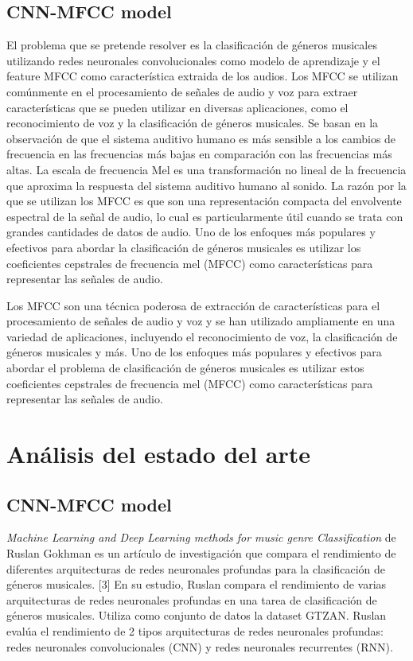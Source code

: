 \documentclass[colorinlistoftodos,twoside,twocolumn,10pt]{article} %
\begin{document}
\subsection {CNN-MFCC model}
    El problema que se pretende resolver es la clasificaci\'on de g\'eneros musicales utilizando redes neuronales convolucionales como modelo de aprendizaje y el feature MFCC como caracter\'istica extraida de los audios.
    Los MFCC se utilizan comúnmente en el procesamiento de señales de audio y voz para extraer características que se pueden utilizar en diversas aplicaciones, como el reconocimiento de voz y la clasificación de géneros musicales. Se basan en la observación de que el sistema auditivo humano es más sensible a los cambios de frecuencia en las frecuencias más bajas en comparación con las frecuencias más altas. La escala de frecuencia Mel es una transformación no lineal de la frecuencia que aproxima la respuesta del sistema auditivo humano al sonido. La razón por la que se utilizan los MFCC es que son una representación compacta del envolvente espectral de la señal de audio, lo cual es particularmente útil cuando se trata con grandes cantidades de datos de audio.
    Uno de los enfoques más populares y efectivos para abordar la clasificación de géneros musicales es utilizar los coeficientes cepstrales de frecuencia mel (MFCC) como características para representar las señales de audio.

    Los MFCC son una técnica poderosa de extracción de características para el procesamiento de señales de audio y voz y se han utilizado ampliamente en una variedad de aplicaciones, incluyendo el reconocimiento de voz, la clasificación de géneros musicales y más.
    Uno de los enfoques más populares y efectivos para abordar el problema de clasificación de géneros musicales es utilizar estos coeficientes cepstrales de frecuencia mel (MFCC) como características para representar las señales de audio.

\section {An\'alisis del estado del arte}
\subsection {CNN-MFCC model}
\textit{Machine Learning and Deep Learning methods for music genre Classification} \cite{Machine Learning and Deep Learning methods for music genre Classification} de Ruslan Gokhman es un artículo de investigación que compara el rendimiento de diferentes arquitecturas de redes neuronales profundas para la clasificación de géneros musicales. [3]
En su estudio, Ruslan compara el rendimiento de varias arquitecturas de redes neuronales profundas en una tarea de clasificación de géneros musicales. Utiliza como conjunto de datos la dataset GTZAN. Ruslan eval\'ua el rendimiento de 2 tipos arquitecturas de redes neuronales profundas: redes neuronales convolucionales (CNN) y redes neuronales recurrentes (RNN).
\end{document}
